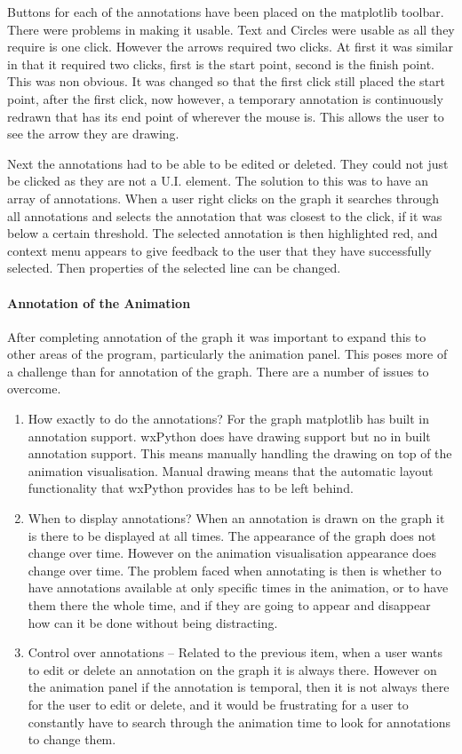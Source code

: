 Buttons for each of the annotations have been placed on the matplotlib toolbar.  There were problems in making it usable.  Text and Circles were usable as all they require is one click.  However the arrows required two clicks.  At first it was similar in that it required two clicks, first is the start point, second is the finish point.  This was non obvious.  It was changed so that the first click still placed the start point, after the first click, now however, a temporary annotation is continuously redrawn that has its end point of wherever the mouse is.  This allows the user to see the arrow they are drawing.

Next the annotations had to be able to be edited or deleted.  They could not just be clicked as they are not a U.I. element.  The solution to this was to have an array of annotations.  When a user right clicks on the graph it searches through all annotations and selects the annotation that was closest to the click, if it was below a certain threshold.  The selected annotation is then highlighted red, and context menu appears to give feedback to the user that they have successfully selected.  Then properties of the selected line can be changed.

\paragraph{Annotation of the Animation}

After completing annotation of the graph it was important to expand this to other areas of the program, particularly the animation panel.  This poses more of a challenge than for annotation of the graph.  There are a number of issues to overcome.

\begin{enumerate}
\item How exactly to do the annotations?  For the graph matplotlib has built in annotation support.  wxPython does have drawing support but no in built annotation support.  This means manually handling the drawing on top of the animation visualisation.  Manual drawing means that the automatic layout functionality that wxPython provides has to be left behind.
\item When to display annotations?  When an annotation is drawn on the graph it is there to be displayed at all times.  The appearance of the graph does not change over time.  However on the animation visualisation appearance does change over time.  The problem faced when annotating is then is whether to have annotations available at only specific times in the animation, or to have them there the whole time, and if they are going to appear and disappear how can it be done without being distracting.
\item Control over annotations -- Related to the previous item, when a user wants to edit or delete an annotation on the graph it is always there.  However on the animation panel if the annotation is temporal, then it is not always there for the user to edit or delete, and it would be frustrating for a user to constantly have to search through the animation time to look for annotations to change them.
\end{enumerate}

